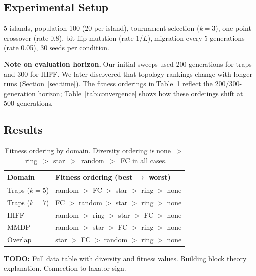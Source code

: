 \documentclass[sigconf,nonacm]{acmart}
\begin{document}
\subsection{Experimental Setup}

5 islands, population 100 (20 per island), tournament selection ($k=3$),
one-point crossover (rate 0.8), bit-flip mutation (rate $1/L$),
migration every 5 generations (rate 0.05), 30 seeds per condition.

\textbf{Note on evaluation horizon.} Our initial sweeps used 200
generations for traps and 300 for HIFF. We later discovered that
topology rankings change with longer runs (Section~\ref{sec:time}).
The fitness orderings in Table~\ref{tab:fitness-ordering} reflect the
200/300-generation horizon; Table~\ref{tab:convergence} shows how
these orderings shift at 500 generations.

\subsection{Results}

\begin{table}[h]
\caption{Fitness ordering by domain. Diversity ordering is
  none~$>$~ring~$>$~star~$>$~random~$>$~FC in all cases.}
\label{tab:fitness-ordering}
\centering
\begin{tabular}{ll}
\toprule
\textbf{Domain} & \textbf{Fitness ordering (best $\to$ worst)} \\
\midrule
Traps ($k=5$)   & random $>$ FC $>$ star $>$ ring $>$ none \\
Traps ($k=7$)   & FC $>$ random $>$ star $>$ ring $>$ none \\
HIFF            & random $>$ ring $>$ star $>$ FC $>$ none \\
MMDP            & random $>$ star $>$ FC $>$ ring $>$ none \\
Overlap         & star $>$ FC $>$ random $>$ ring $>$ none \\
\bottomrule
\end{tabular}
\end{table}


\textbf{TODO:} Full data table with diversity and fitness values.
Building block theory explanation. Connection to laxator sign.

\end{document}
